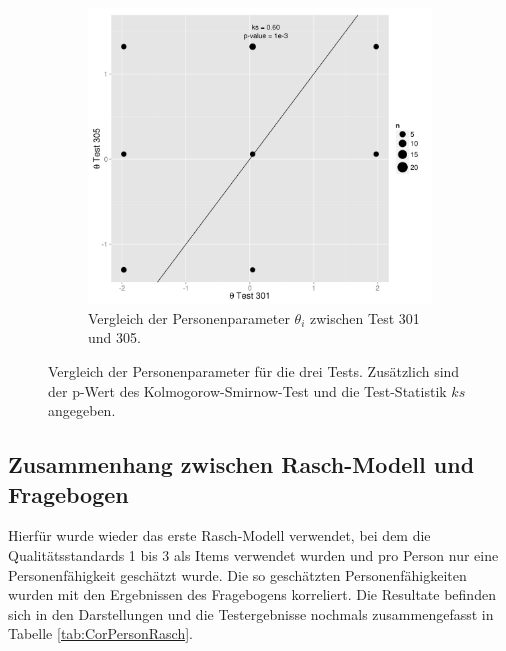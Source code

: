 \begin{figure}[htp]
  \begin{subfigure}{0.5\textwidth}
    \includegraphics[width=1.0\linewidth]{graphics/GOF301305Pers.png}
    \caption{Vergleich der Personenparameter $\theta_i$ zwischen Test 301 und 305.}
    \label{fig:GOF301305P}
  \end{subfigure}
 
 \caption{Vergleich der Personenparameter für die drei Tests. Zusätzlich sind der p-Wert des Kolmogorow-Smirnow-Test und die Test-Statistik $ks$ angegeben.}
 \label{fig:GOFP}
 \end{figure}
 
\clearpage 
\subsection{Zusammenhang zwischen Rasch-Modell und Fragebogen}

Hierfür wurde wieder das erste Rasch-Modell verwendet, bei dem die Qualitätsstandards 1 bis 3 als Items verwendet wurden und pro Person nur eine Personenfähigkeit geschätzt wurde.
Die so geschätzten Personenfähigkeiten wurden mit den Ergebnissen des Fragebogens korreliert. Die Resultate befinden sich in den Darstellungen  und die Testergebnisse nochmals zusammengefasst in Tabelle \ref{tab:CorPersonRasch}.

